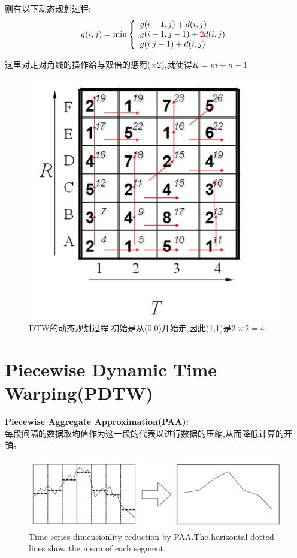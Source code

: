 \documentclass[UTF8,a4paper]{ctexart}
\begin{document}
  则有以下动态规划过程:
  \begin{equation}
    g(i,j) = \min  \left \{
    \begin{array}{l}
      g(i - 1,j) + d(i,j)\\
      g(i - 1, j - 1) + {\color{red} 2}d(i , j)\\
      g(i.j - 1) + d(i , j)
    \end{array}
    \right .
  \end{equation}

  这里对走对角线的操作给与双倍的惩罚($\times 2$),就使得$K = m+n-1$

  \begin{figure}[H]
    \centering
    \includegraphics[scale = 0.5]{assets/DynamicTimeWarping(DTW)_6f31e.png}
    \caption{DTW的动态规划过程:初始是从(0,0)开始走,因此(1,1)是$2\times 2 = 4$}
  \end{figure}
  \newpage
  \section{Piecewise Dynamic Time Warping(PDTW)}

  \textbf{Piecewise Aggregate Approximation(PAA):}\\
  每段间隔的数据取均值作为这一段的代表以进行数据的压缩,从而降低计算的开销。

  \begin{figure}[H]
    \centering
    \includegraphics[scale = 0.3]{assets/DynamicTimeWarping(DTW)_1d23a.png}
    \caption{Time series dimensionlity reduction by PAA.The horizontal dotted lines
    show the mean of each segment.}
  \end{figure}
\end{document}
